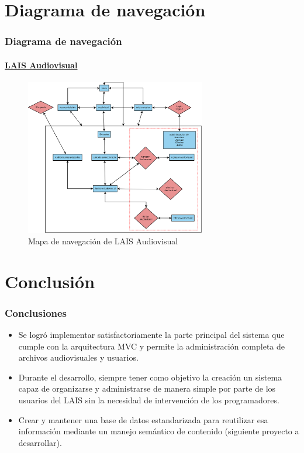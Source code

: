 \documentclass{beamer}
\begin{document}
\section{Diagrama de navegación}
\begin{frame}
	\frametitle{Diagrama de navegación}
	\framesubtitle{\href{http://localhost/lais-audiovisual/public/}{LAIS Audiovisual}}	
	\begin{figure}[H]
		\centering
		\includegraphics[width=0.7\textwidth]{navegacion.png} %
		\caption{Mapa de navegación de LAIS Audiovisual}
		\label{fig:esquema_general}
	\end{figure}
\end{frame}

\section{Conclusión}
\begin{frame}
	\frametitle{Conclusiones}
	\begin{itemize}
		\item Se logró implementar satisfactoriamente la parte principal del sistema que cumple con la arquitectura MVC y permite la administración completa de archivos audiovisuales y usuarios.
		\item Durante el desarrollo, siempre tener como objetivo la creación un sistema capaz de organizarse y administrarse de manera simple por parte de los usuarios del LAIS sin la necesidad de intervención de los programadores.
		\item Crear y mantener una base de datos estandarizada para reutilizar esa información mediante un manejo semántico de contenido (siguiente proyecto a desarrollar).
	\end{itemize}
\end{frame}
\end{document}
